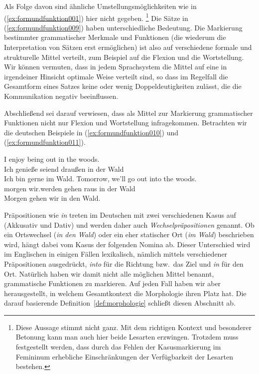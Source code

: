 Als Folge davon sind ähnliche Umstellungsmöglichkeiten wie in (\ref{ex:formundfunktion001}) hier nicht gegeben.%
\footnote{Diese Aussage stimmt nicht ganz.
Mit dem richtigen Kontext und besonderer Betonung kann man auch hier beide Lesarten erzwingen.
Trotzdem muss festgestellt werden, dass durch das Fehlen der Kasusmarkierung im Femininum erhebliche Einschränkungen der Verfügbarkeit der Lesarten bestehen.}
Die Sätze in (\ref{ex:formundfunktion009}) haben unterschiedliche Bedeutung.
Die Markierung bestimmter grammatischer Merkmale und Funktionen (die wiederum die Interpretation von Sätzen erst ermöglichen) ist also auf verschiedene formale und strukturelle Mittel verteilt, zum Beispiel auf die Flexion und die Wortstellung.
Wir können vermuten, dass in jedem Sprachsystem die Mittel auf eine in irgendeiner Hinsicht optimale Weise verteilt sind, so dass im Regelfall die Gesamtform eines Satzes keine oder wenig Doppeldeutigkeiten zulässt, die die Kommunikation negativ beeinflussen.

Abschließend sei darauf verwiesen, dass als Mittel zur Markierung grammatischer Funktionen nicht nur Flexion und Wortstellung infragekommen.
Betrachten wir die deutschen Beispiele in (\ref{ex:formundfunktion010}) und (\ref{ex:formundfunktion011}).

\begin{exe}
  \ex \label{ex:formundfunktion010}
  \begin{xlist}
  \end{xlist}
  \ex \label{ex:formundfunktion011}
  \begin{xlist}
    \ex\gll I enjoy being out in the woods.\\
    Ich genieße seiend draußen in der Wald\\
    \glt Ich bin gerne im Wald.
    \ex\gll Tomorrow, {we'll} go out into the woods.\\
    morgen {wir.werden} gehen raus in der Wald\\
    \glt Morgen gehen wir in den Wald.
  \end{xlist}
\end{exe}


Präpositionen wie \textit{in} treten im Deutschen mit zwei verschiedenen Kasus auf (Akkusativ und Dativ) und werden daher auch \textit{Wechselpräpositionen} genannt.
Ob ein Ortswechsel (\textit{in den Wald}) oder ein eher statischer Ort (\textit{im Wald}) beschrieben wird, hängt dabei vom Kasus der folgenden Nomina ab.
Dieser Unterschied wird \zB im Englischen in einigen Fällen lexikalisch, nämlich mittels verschiedener Präpositionen ausgedrückt, \textit{into} für die Richtung bzw.\ das Ziel und \textit{in} für den Ort.
Natürlich haben wir damit nicht alle möglichen Mittel benannt, grammatische Funktionen zu markieren.
Auf jeden Fall haben wir aber herausgestellt, in welchem Gesamtkontext die Morphologie ihren Platz hat.
Die darauf basierende Definition~\ref{def:morphologie} schließt diesen Abschnitt ab.

